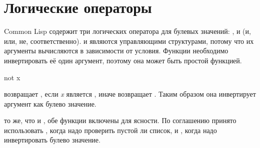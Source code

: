 \section{Логические операторы}

Common Lisp содержит три логических оператора для булевых значений:
,  и  (и, или, не, соответственно).  и
 являются управляющими структурами, потому что их аргументы
вычисляются в зависимости от условия.
Функции  необходимо инвертировать её один аргумент, поэтому она может
быть простой функцией.

\begin{defun}[Функция]
not x

 возвращает {\true}, если \emph{x} является {\false}, иначе
возвращает {\false}.
Таким образом она инвертирует аргумент как булево значение.

 то же, что и , обе функции включены для ясности. По
соглашению принято использовать , когда надо проверить пустой ли
список, и , когда надо инвертировать булево значение.
\end{defun}

